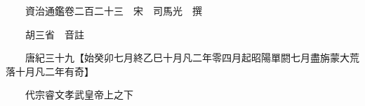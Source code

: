 










 


 
 


 

  
  
  
  
  





  
  
  
  
  
 
  

  

  
  
  



  

 
 

  
   




  

  
  


  　　資治通鑑卷二百二十三　宋　司馬光　撰

　　胡三省　音註

　　唐紀三十九【始癸卯七月終乙巳十月凡二年零四月起昭陽單閼七月盡旃蒙大荒落十月凡二年有奇】

　　代宗睿文孝武皇帝上之下

